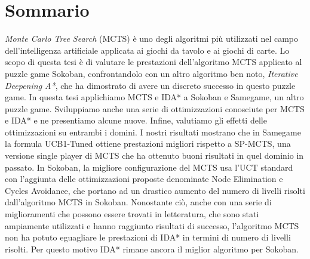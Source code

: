 \newpage
\chapter*{Sommario}
\textit{Monte Carlo Tree Search} (MCTS) è uno degli algoritmi più utilizzati nel campo dell'intelligenza artificiale applicata ai giochi da tavolo e ai giochi di carte.
Lo scopo di questa tesi è di valutare le prestazioni dell'algoritmo MCTS applicato al puzzle game Sokoban, confrontandolo con un altro algoritmo ben noto, \textit{Iterative Deepening A*}, che ha dimostrato di avere un discreto successo in questo puzzle game.
In questa tesi applichiamo MCTS e IDA* a Sokoban e Samegame, un altro puzzle game. Sviluppiamo anche una serie di ottimizzazioni conosciute per MCTS e IDA* e ne presentiamo alcune nuove. Infine, valutiamo gli effetti delle ottimizzazioni su entrambi i domini. I nostri risultati mostrano che in Samegame la formula UCB1-Tuned ottiene prestazioni migliori rispetto a SP-MCTS, una versione single player di MCTS che ha ottenuto buoni risultati in quel dominio in passato. In Sokoban, la migliore configurazione del MCTS usa l'UCT standard con l'aggiunta delle ottimizzazioni proposte denominate Node Elimination e Cycles Avoidance, che portano ad un drastico aumento del numero di livelli risolti dall'algoritmo MCTS in Sokoban. Nonostante ciò, anche con una serie di miglioramenti che possono essere trovati in letteratura, che sono stati ampiamente utilizzati e hanno raggiunto risultati di successo, l'algoritmo MCTS non ha potuto eguagliare le prestazioni di IDA* in termini di numero di livelli risolti. Per questo motivo IDA* rimane ancora il miglior algoritmo per Sokoban.